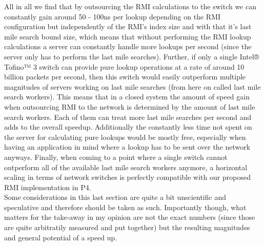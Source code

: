 All in all we find that by outsourcing the RMI calculations to the switch we can constantly gain around 50 - 100ns per lookup depending on the RMI configuration but independently of the RMI's index size and with that it's last mile search bound size, which means that without performing the RMI lookup calculations a server can constantly handle more lookups per second (since the server only has to perform the last mile searches). Further, if only a single Intel® Tofino™ 3 switch can provide pure lookup operations at a rate of around 10 billion packets per second, then this switch would easily outperform multiple magnitudes of servers working on last mile searches (from here on called last mile search workers). This means that in a closed system the amount of speed gain when outsourcing RMI to the network is determined by the amount of last mile search workers. Each of them can treat more last mile searches per second and adds to the overall speedup. Additionally the constantly less time not spent on the server for calculating pure lookups would be mostly free, especially when having an application in mind where a lookup has to be sent over the network anyways. Finally, when coming to a point where a single switch cannot outperform all of the available last mile search workers anymore, a horizontal scaling in terms of network switches is perfectly compatible with our proposed RMI implementation in P4.\\

Some considerations in this last section are quite a bit unscientific and speculative and therefore should be taken as such. Importantly though, what matters for the take-away in my opinion are not the exact numbers (since those are quite arbitratily measured and put together) but the resulting magnitudes and general potential of a speed up.
